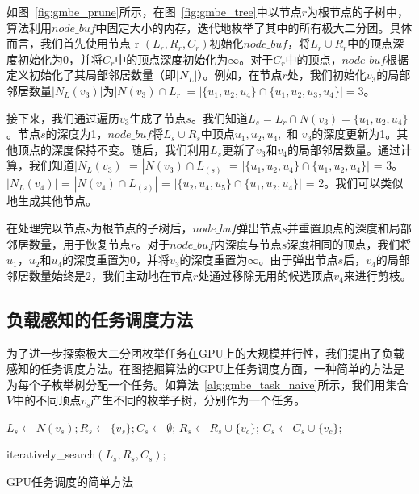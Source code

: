 \begin{example}
  如图~\ref{fig:gmbe_prune}所示，在图~\ref{fig:gmbe_tree}中以节点$r$为根节点的子树中，算法利用$node\_buf$中固定大小的内存，迭代地枚举了其中的所有极大二分团。具体而言，我们首先使用节点 r $(L_r, R_r, C_r)$初始化$node\_buf$，将$L_r \cup R_r$中的顶点深度初始化为0，并将$C_r$中的顶点深度初始化为$\infty$。对于$C_r$中的顶点，$node\_buf$根据定义初始化了其局部邻居数量（即$|N_L|$）。例如，在节点$r$处，我们初始化$v_3$的局部邻居数量$|N_L(v_3)|$为$|N(v_3) \cap L_r| = 
  |\{u_1, u_2, u_4\}\cap \{u_1,u_2,u_3,u_4\}| = 3$。

  接下来，我们通过遍历$v_3$生成了节点$s$。我们知道$L_s=L_r\cap N(v_3)=\{u_1, u_2, u_4\}$。节点$s$的深度为1，$node\_buf$将$L_s\cup R_s$中顶点$u_1, u_2, u_4,$ 和 $v_3$的深度更新为1。其他顶点的深度保持不变。随后，我们利用$L_s$更新了$v_3$和$v_4$的局部邻居数量。通过计算，我们知道$|N_L(v_3)|$ = $|N(v_3) \cap L_{(s)}|$
  = $|\{u_1, u_2, u_4\} \cap \{u_1, u_2, u_4\}|$ = 3。
  $|N_L(v_4)|$ = $|N(v_4) \cap L_{(s)}|$
  = $|\{u_2, u_4, u_5\} \cap \{u_1, u_2, u_4\}|$ = 2。我们可以类似地生成其他节点。

在处理完以节点$s$为根节点的子树后，$node\_buf$弹出节点$s$并重置顶点的深度和局部邻居数量，用于恢复节点$r$。对于$node\_buf$内深度与节点$s$深度相同的顶点，我们将$u_1$，$u_2$和$u_4$的深度重置为0，并将$v_3$的深度重置为$\infty$。由于弹出节点$s$后，$v_4$的局部邻居数量始终是2，我们主动地在节点$r$处通过移除无用的候选顶点$v_4$来进行剪枝。


\end{example}


\subsection{负载感知的任务调度方法}
\label{subsec:gmbe_design_load}

为了进一步探索极大二分团枚举任务在GPU上的大规模并行性，我们提出了负载感知的任务调度方法。在图挖掘算法的GPU上任务调度方面，一种简单的方法是为每个子枚举树分配一个任务。如算法~\ref{alg:gmbe_task_naive}所示，我们用集合$V$中的不同顶点$v_s$产生不同的枚举子树，分别作为一个任务。

\begin{algorithm} [H]
  \begin{algorithmic}[1]
    \normalsize
    
      \STATE $L_s \leftarrow N(v_s); R_s\leftarrow\{v_s\}; C_s\leftarrow \emptyset $;
          \STATE $R_s \leftarrow R_s \cup \{v_c\}$;
          \STATE $C_s \leftarrow C_s \cup \{v_c\}$;
        \ENDIF 
      \ENDFOR

        \STATE \textsf{iteratively\_search}$(L_s,R_s,C_s)$;
      \ENDIF

    \ENDFOR

  \end{algorithmic}
  \caption{GPU任务调度的简单方法}
  \label{alg:gmbe_task_naive}
\end{algorithm}


